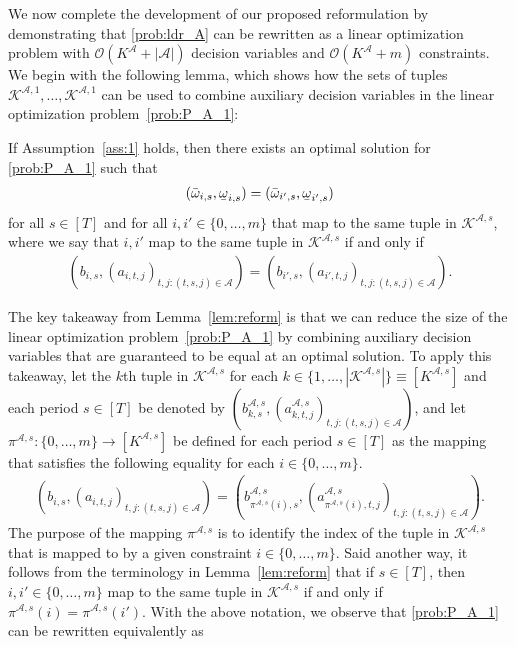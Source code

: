 \documentclass[nonblindrev,mnsc]{informs3} %
\newcommand{\ubar}[1]{\text{\b{$#1$}}}
\begin{document}
We now complete the development of our proposed reformulation  by demonstrating that \eqref{prob:ldr_A} can be rewritten as a linear optimization problem with $\mathcal{O}(K^{\mathcal{A}} + | \mathcal{A}|)$ decision variables and $\mathcal{O}(K^{\mathcal{A}} + m)$   constraints. 
We begin with the following lemma, which shows how the sets of tuples $\mathcal{K}^{\mathcal{A},1},\ldots, \mathcal{K}^{\mathcal{A},1}$ can be used to combine auxiliary decision variables in the linear optimization problem~\eqref{prob:P_A_1}:\begin{lemma}\label{lem:reform}
    If Assumption~\ref{ass:1} holds, then there exists an optimal solution for \eqref{prob:P_A_1} such that
        \begin{align*}
       (\bar{\omega}_{i,s}, \ubar{\omega}_{i,s}) = (\bar{\omega}_{i',s}, \ubar{\omega}_{i',s})
    \end{align*}
    for all $s \in [T]$ and for all $i,i' \in \{0,\ldots,m\}$ that map to the same tuple in $\mathcal{K}^{\mathcal{A},s}$, where we say that $i,i'$ map to the same tuple in $\mathcal{K}^{\mathcal{A},s}$ if and only if
    \begin{align*}
\left(b_{i,s}, \left( a_{i,t,j} \right)_{t,j: (t,s,j) \in \mathcal{A}}\right) = \left(b_{i',s}, \left( a_{i',t,j} \right)_{t,j: (t,s,j) \in \mathcal{A}}\right).
    \end{align*}
\end{lemma}
The key takeaway from Lemma~\ref{lem:reform} is that we can reduce the size of the linear optimization problem~\eqref{prob:P_A_1}  by combining auxiliary decision variables that are guaranteed  to be equal at an optimal solution. To apply this takeaway,   let the $k$th tuple in $\mathcal{K}^{\mathcal{A},s}$ for each $k \in \{1,\ldots,| \mathcal{K}^{\mathcal{A},s}|\} \equiv [K^{\mathcal{A},s}]$ and each period $s \in [T]$ be denoted by $
   ({b}^{\mathcal{A},s}_{k,s}, ( a^{\mathcal{A},s}_{k,t,j} )_{t,j: (t,s,j) \in \mathcal{A}})$, 
and let $\pi^{\mathcal{A},s}: \{0,\ldots,m\} \to [K^{\mathcal{A},s}]$  be defined for each period $s \in [T]$ as  the mapping that satisfies the following equality for each $i \in \{0,\ldots,m\}$.
\begin{align*}
 \left(b_{i,s}, \left( a_{i,t,j} \right)_{t,j: (t,s,j) \in \mathcal{A}}\right) =   \left({b}^{\mathcal{A},s}_{ \pi^{\mathcal{A},s}(i),s}, \left( a^{\mathcal{A},s}_{ \pi^{\mathcal{A},s}(i),t,j} \right)_{t,j: (t,s,j) \in \mathcal{A}}\right). 
\end{align*}
The purpose of the mapping $\pi^{\mathcal{A},s}$ is to identify the index of the tuple in $\mathcal{K}^{\mathcal{A},s}$ that is mapped to by a given constraint $i \in \{0,\ldots,m\}$. Said another way, it follows from the terminology in Lemma~\ref{lem:reform} that if $s \in [T]$, then $i,i' \in \{0,\ldots,m\}$ map to the same tuple in $\mathcal{K}^{\mathcal{A},s}$ if and only if $\pi^{\mathcal{A},s}(i) = \pi^{\mathcal{A},s}(i')$.   With the above notation, we  observe that \eqref{prob:P_A_1} can be rewritten equivalently as
\end{document}
